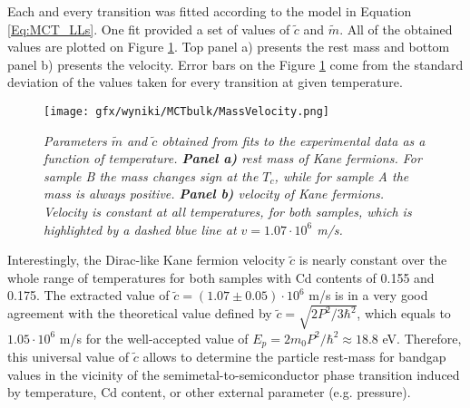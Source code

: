 \documentclass[titlepage,a4paper]{book}
\begin{document}
Each and every transition was fitted according to the model in Equation \ref{Eq:MCT_LLs}. One fit provided a set of values of $\tilde{c}$ and $\tilde{m}$. All of the obtained values are plotted on Figure \ref{fig:Bulk_MassVelocity}. Top panel a) presents the rest mass and bottom panel b) presents the velocity. Error bars on the Figure \ref{fig:Bulk_MassVelocity} come from the standard deviation of the values taken for every transition at given temperature.

\begin{figure}[ht]
	\centering
	\texttt{[image: gfx/wyniki/MCTbulk/MassVelocity.png]}
	\vspace{-10pt}
	\caption{\textit{Parameters $\tilde{m}$ and $\tilde{c}$ obtained from fits to the experimental data as a function of temperature. \textbf{Panel a)} rest mass of Kane fermions. For sample B the mass changes sign at the $T_c$, while for sample A the mass is always positive. \textbf{Panel b)} velocity of Kane fermions. Velocity is constant at all temperatures, for both samples, which is highlighted by a dashed blue line at $v = 1.07 \cdot 10^6$ m/s. }}
	\label{fig:Bulk_MassVelocity}
\end{figure}

Interestingly, the Dirac-like Kane fermion velocity $\tilde{c}$ is nearly constant over the whole range of temperatures for both samples with Cd contents of 0.155 and 0.175. The extracted value of $\tilde{c} = (1.07 \pm 0.05)\cdot 10^6$ m/s is in a very good agreement with the theoretical value defined by $\tilde{c} = \sqrt{2 P^2/3\hbar^2}$, which equals to $1.05 \cdot 10^6$ m/s for the well-accepted value of $E_p = 2m_0 P^2/ \hbar^2 \approx 18.8$ eV. Therefore, this universal value of $\tilde{c}$ allows to determine the particle rest-mass for bandgap values in the vicinity of the semimetal-to-semiconductor phase transition induced by temperature, Cd content, or other external parameter (e.g. pressure).

\end{document}
